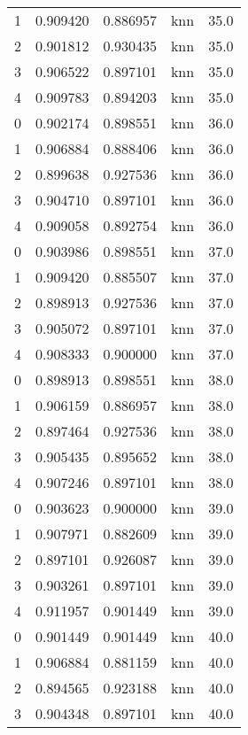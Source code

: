 \begin{tabular}{rrrlr}
     1 & 0.909420 & 0.886957 &      knn &       35.0 \\
     2 & 0.901812 & 0.930435 &      knn &       35.0 \\
     3 & 0.906522 & 0.897101 &      knn &       35.0 \\
     4 & 0.909783 & 0.894203 &      knn &       35.0 \\
     0 & 0.902174 & 0.898551 &      knn &       36.0 \\
     1 & 0.906884 & 0.888406 &      knn &       36.0 \\
     2 & 0.899638 & 0.927536 &      knn &       36.0 \\
     3 & 0.904710 & 0.897101 &      knn &       36.0 \\
     4 & 0.909058 & 0.892754 &      knn &       36.0 \\
     0 & 0.903986 & 0.898551 &      knn &       37.0 \\
     1 & 0.909420 & 0.885507 &      knn &       37.0 \\
     2 & 0.898913 & 0.927536 &      knn &       37.0 \\
     3 & 0.905072 & 0.897101 &      knn &       37.0 \\
     4 & 0.908333 & 0.900000 &      knn &       37.0 \\
     0 & 0.898913 & 0.898551 &      knn &       38.0 \\
     1 & 0.906159 & 0.886957 &      knn &       38.0 \\
     2 & 0.897464 & 0.927536 &      knn &       38.0 \\
     3 & 0.905435 & 0.895652 &      knn &       38.0 \\
     4 & 0.907246 & 0.897101 &      knn &       38.0 \\
     0 & 0.903623 & 0.900000 &      knn &       39.0 \\
     1 & 0.907971 & 0.882609 &      knn &       39.0 \\
     2 & 0.897101 & 0.926087 &      knn &       39.0 \\
     3 & 0.903261 & 0.897101 &      knn &       39.0 \\
     4 & 0.911957 & 0.901449 &      knn &       39.0 \\
     0 & 0.901449 & 0.901449 &      knn &       40.0 \\
     1 & 0.906884 & 0.881159 &      knn &       40.0 \\
     2 & 0.894565 & 0.923188 &      knn &       40.0 \\
     3 & 0.904348 & 0.897101 &      knn &       40.0 \\

\end{tabular}
